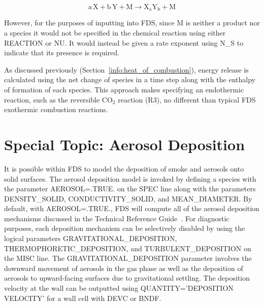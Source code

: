 \documentclass[11pt]{book}
\begin{document}
\begin{equation}\label{eq:inert_1step}
\mathrm{a \, X + b \, Y + M \rightarrow X_aY_b + M }
\end{equation}

However, for the purposes of inputting into FDS, since M is neither a product nor a species it would not be specified in the chemical reaction using either {\ct REACTION} or {\ct NU}.  It would instead be given a rate exponent using {\ct N\_S} to indicate that its presence is required.

As discussed previously (Section~\ref{info:heat_of_combustion}), energy release is calculated using the net change of species in a time step along with the enthalpy of formation of each species. This approach makes specifying an endothermic reaction, such as the reversible CO$_2$ reaction (R3), no different than typical FDS exothermic combustion reactions.



\section{Special Topic: Aerosol Deposition}
\label{info:deposition}

It is possible within FDS to model the deposition of smoke and aerosols onto solid surfaces. The aerosol deposition model is invoked by defining a species with the parameter {\ct AEROSOL=.TRUE.} on the {\ct SPEC} line along with the parameters {\ct DENSITY\_SOLID}, {\ct CONDUCTIVITY\_SOLID}, and {\ct MEAN\_DIAMETER}. By default, with {\ct AEROSOL=.TRUE.}, FDS will compute all of the aerosol deposition mechanisms discussed in the Technical Reference Guide~\cite{FDS_Math_Guide}. For diagnostic purposes, each deposition mechanism can be selectively disabled by using the logical parameters {\ct GRAVITATIONAL\_DEPOSITION}, {\ct THERMOPHORETIC\_DEPOSITION}, and {\ct TURBULENT\_DEPOSITION} on the {\ct MISC} line. The {\ct GRAVITATIONAL\_DEPOSITION} parameter involves the downward movement of aerosols in the gas phase as well as the deposition of aerosols to upward-facing surfaces due to gravitational settling.  The deposition velocity at the wall can be outputted using {\ct QUANTITY='DEPOSITION VELOCITY'} for a wall cell with {\ct DEVC} or {\ct BNDF}.
\end{document}
